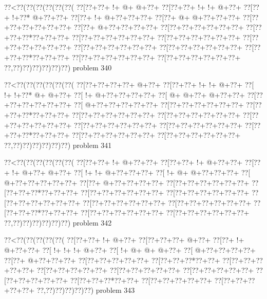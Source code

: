\vbox{\vbox{\goo
\0??<\0??(\0??(\0??(\0??(\0??(\0??(
\0??[\0??+\0??+\- !+\- @+\- @+\0??+
\0??[\0??+\0??+\- !+\- !+\- @+\0??+
\0??[\0??+\- !+\0??*\- @+\0??+\0??+
\0??[\0??+\- !+\- @+\0??+\0??+\0??+
\0??[\0??+\- @+\- @+\0??+\0??+\0??+
\0??[\0??+\0??+\0??+\0??+\0??+\0??+
\0??[\0??+\- @+\0??+\0??+\0??+\0??+
\0??[\0??+\0??+\0??+\0??+\0??+\0??+
\0??[\0??+\0??+\0??*\0??+\0??+\0??+
\0??[\0??+\0??+\0??+\0??+\0??+\0??+
\0??[\0??+\0??+\0??+\0??+\0??+\0??+
\0??[\0??+\0??+\0??+\0??+\0??+\0??+
\0??[\0??+\0??+\0??+\0??+\0??+\0??+
\0??[\0??+\0??+\0??+\0??+\0??+\0??+
\0??[\0??+\0??+\0??*\0??+\0??+\0??+
\0??[\0??+\0??+\0??+\0??+\0??+\0??+
\0??[\0??+\0??+\0??+\0??+\0??+\0??+
\0??,\0??)\0??)\0??)\0??)\0??)\0??)
}
\hfil problem 340\hfil\break
}

\vbox{\vbox{\goo
\0??<\0??(\0??(\0??(\0??(\0??(\0??(
\0??[\0??+\0??+\0??+\0??+\- @+\0??+
\0??[\0??+\0??+\- !+\- !+\- @+\0??+
\0??[\- !+\- !+\0??*\- @+\- @+\0??+
\0??[\- !+\- @+\0??+\0??+\0??+\0??+
\0??[\- @+\- @+\0??+\- @+\0??+\0??+
\0??[\0??+\0??+\0??+\0??+\0??+\0??+
\0??[\- @+\0??+\0??+\0??+\0??+\0??+
\0??[\0??+\0??+\0??+\0??+\0??+\0??+
\0??[\0??+\0??+\0??*\0??+\0??+\0??+
\0??[\0??+\0??+\0??+\0??+\0??+\0??+
\0??[\0??+\0??+\0??+\0??+\0??+\0??+
\0??[\0??+\0??+\0??+\0??+\0??+\0??+
\0??[\0??+\0??+\0??+\0??+\0??+\0??+
\0??[\0??+\0??+\0??+\0??+\0??+\0??+
\0??[\0??+\0??+\0??*\0??+\0??+\0??+
\0??[\0??+\0??+\0??+\0??+\0??+\0??+
\0??[\0??+\0??+\0??+\0??+\0??+\0??+
\0??,\0??)\0??)\0??)\0??)\0??)\0??)
}
\hfil problem 341\hfil\break
}

\vbox{\vbox{\goo
\0??<\0??(\0??(\0??(\0??(\0??(\0??(
\0??[\0??+\0??+\- !+\- @+\0??+\0??+
\0??[\0??+\0??+\- !+\- @+\0??+\0??+
\0??[\0??+\- !+\- @+\0??+\- @+\0??+
\0??[\- !+\- !+\- @+\0??+\0??+\0??+
\0??[\- !+\- @+\- @+\0??+\0??+\0??+
\0??[\- @+\0??+\0??+\0??+\0??+\0??+
\0??[\0??+\- @+\0??+\0??+\0??+\0??+
\0??[\0??+\0??+\0??+\0??+\0??+\0??+
\0??[\0??+\0??+\0??*\0??+\0??+\0??+
\0??[\0??+\0??+\0??+\0??+\0??+\0??+
\0??[\0??+\0??+\0??+\0??+\0??+\0??+
\0??[\0??+\0??+\0??+\0??+\0??+\0??+
\0??[\0??+\0??+\0??+\0??+\0??+\0??+
\0??[\0??+\0??+\0??+\0??+\0??+\0??+
\0??[\0??+\0??+\0??*\0??+\0??+\0??+
\0??[\0??+\0??+\0??+\0??+\0??+\0??+
\0??[\0??+\0??+\0??+\0??+\0??+\0??+
\0??,\0??)\0??)\0??)\0??)\0??)\0??)
}
\hfil problem 342\hfil\break
}

\vbox{\vbox{\goo
\0??<\0??(\0??(\0??(\0??(\0??(
\0??[\0??+\0??+\- !+\- @+\0??+
\0??[\0??+\0??+\0??+\- @+\0??+
\0??[\0??+\- !+\- @+\0??+\0??+
\0??[\- !+\- !+\- !+\- @+\0??+
\0??[\- !+\- @+\- @+\- @+\0??+
\0??[\- @+\0??+\0??+\0??+\0??+
\0??[\0??+\- @+\0??+\0??+\0??+
\0??[\0??+\0??+\0??+\0??+\0??+
\0??[\0??+\0??+\0??*\0??+\0??+
\0??[\0??+\0??+\0??+\0??+\0??+
\0??[\0??+\0??+\0??+\0??+\0??+
\0??[\0??+\0??+\0??+\0??+\0??+
\0??[\0??+\0??+\0??+\0??+\0??+
\0??[\0??+\0??+\0??+\0??+\0??+
\0??[\0??+\0??+\0??*\0??+\0??+
\0??[\0??+\0??+\0??+\0??+\0??+
\0??[\0??+\0??+\0??+\0??+\0??+
\0??,\0??)\0??)\0??)\0??)\0??)
}
\hfil problem 343\hfil\break
}

